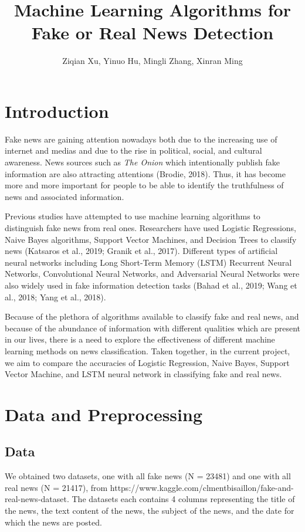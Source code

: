 \documentclass{article}
\title{Machine Learning Algorithms for Fake or Real News Detection}
\author{Ziqian Xu, Yinuo Hu, Mingli Zhang, Xinran Ming}
\date{}
\begin{document}
\maketitle


\begin{multicols}{2}
\section{Introduction}

Fake news are gaining attention nowadays both due to the increasing use of internet and medias and due to the rise in political, social, and cultural awareness. News sources such as \emph{The Onion} which intentionally publish fake information are also attracting attentions (Brodie, 2018). Thus, it has become more and more important for people to be able to identify the truthfulness of news and associated information.\par
Previous studies have attempted to use machine learning algorithms to distinguish fake news from real ones. Researchers have used Logistic Regressions, Naive Bayes algorithms, Support Vector Machines, and Decision Trees to classify news (Katsaros et al., 2019; Granik et al., 2017). Different types of artificial neural networks including Long Short-Term Memory (LSTM) Recurrent Neural Networks, Convolutional Neural Networks, and Adversarial Neural Networks were also widely used in fake information detection tasks (Bahad et al., 2019; Wang et al., 2018; Yang et al., 2018). \par
Because of the plethora of algorithms available to classify fake and real news, and because of the abundance of information with different qualities which are present in our lives, there is a need to explore the effectiveness of different machine learning methods on news classification. Taken together, in the current project, we aim to compare the accuracies of Logistic Regression, Naive Bayes, Support Vector Machine, and LSTM neural network in classifying fake and real news. 


\section{Data and Preprocessing}

\subsection{Data}
We obtained two datasets, one with all fake news (N = 23481) and one with all real news (N = 21417), from https://www.kaggle.com/clmentbisaillon/fake-and-real-news-dataset. The datasets each contains 4 columns representing the title of the news, the text content of the news, the subject of the news, and the date for which the news are posted. 


\end{multicols}
\end{document}
